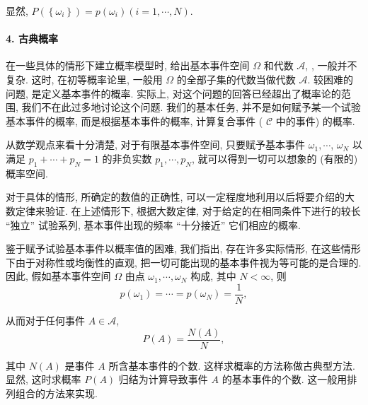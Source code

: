 显然, $P\left(\left\{\omega_i\right\}\right)=p\left(\omega_i\right)(i=1, \cdots, N)$. 

\paragraph{4. 古典概率}在一些具体的情形下建立概率模型时, 给出基本事件空间 $\Omega$ 和代数 $\mathscr{A}$, , 一般并不复杂. 这时, 在初等概率论里, 一般用 $\Omega$ 的全部子集的代数当做代数 $\mathscr{A}$. 较困难的问题, 是定义基本事件的概率. 实际上, 对这个问题的回答已经超出了概率论的范围, 我们不在此过多地讨论这个问题. 我们的基本任务, 并不是如何赋予某一个试验基本事件的概率, 而是根据基本事件的概率, 计算复合事件 ( $\mathscr{C}$ 中的事件) 的概率.

从数学观点来看十分清楚, 对于有限基本事件空间, 只要赋予基本事件 $\omega_1, \cdots$, $\omega_N$ 以满足 $p_1+\cdots+p_N=1$ 的非负实数 $p_1, \cdots, p_N$, 就可以得到一切可以想象的 (有限的) 概率空间.

对于具体的情形, 所确定的数值的正确性, 可以一定程度地利用以后将要介绍的大数定律来验证. 在上述情形下, 根据大数定律, 对于给定的在相同条件下进行的较长 ``独立'' 试验系列, 基本事件出现的频率 ``十分接近'' 它们相应的概率.

鉴于赋予试验基本事件以概率值的困难, 我们指出, 存在许多实际情形, 在这些情形下由于对称性或均衡性的直观, 把一切可能出现的基本事件视为等可能的是合理的. 因此, 假如基本事件空间 $\Omega$ 由点 $\omega_1, \cdots, \omega_N$ 构成, 其中 $N<\infty$, 则
$$
p\left(\omega_1\right)=\cdots=p\left(\omega_N\right)=\frac{1}{N},
$$

从而对于任何事件 $A \in \mathscr{A}$,
$$
P(A)=\frac{N(A)}{N},
$$

其中 $N(A)$ 是事件 $A$ 所含基本事件的个数.
这样求概率的方法称做古典型方法. 显然, 这时求概率 $P(A)$ 归结为计算导致事件 $A$ 的基本事件的个数. 这一般用排列组合的方法来实现. 
